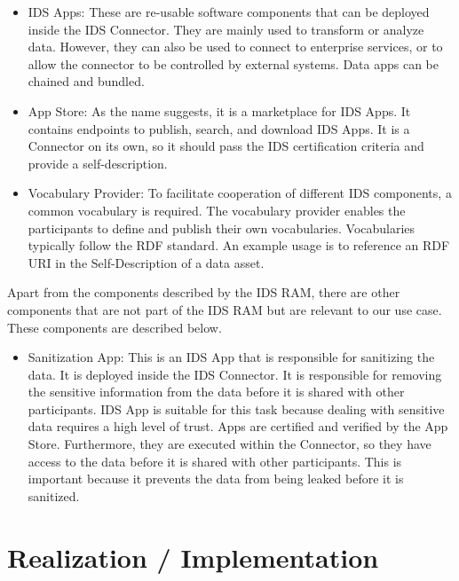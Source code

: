 \documentclass{article}
\begin{document}
\begin{itemize}
    \item IDS Apps: These are re-usable software components that can be deployed inside the IDS Connector. They are mainly used to transform or analyze data. However, they can also be used to connect to enterprise services, or to allow the connector to be controlled by external systems. Data apps can be chained and bundled.
    \item App Store: As the name suggests, it is a marketplace for IDS Apps. It contains endpoints to publish, search, and download IDS Apps. It is a Connector on its own, so it should pass the IDS certification criteria and provide a self-description.
    \item Vocabulary Provider: To facilitate cooperation of different IDS components, a common vocabulary is required. The vocabulary provider enables the participants to define and publish their own vocabularies. Vocabularies typically follow the RDF standard. An example usage is to reference an RDF URI in the Self-Description of a data asset.
\end{itemize}

Apart from the components described by the IDS RAM, there are other components that are not part of the IDS RAM but are relevant to our use case. These components are described below.

\begin{itemize}
    \item Sanitization App: This is an IDS App that is responsible for sanitizing the data. It is deployed inside the IDS Connector. It is responsible for removing the sensitive information from the data before it is shared with other participants. IDS App is suitable for this task because dealing with sensitive data requires a high level of trust. Apps are certified and verified by the App Store. Furthermore, they are executed within the Connector, so they have access to the data before it is shared with other participants. This is important because it prevents the data from being leaked before it is sanitized. 
\end{itemize}

\section{Realization / Implementation} %
\label{sec:realization}
\end{document}
